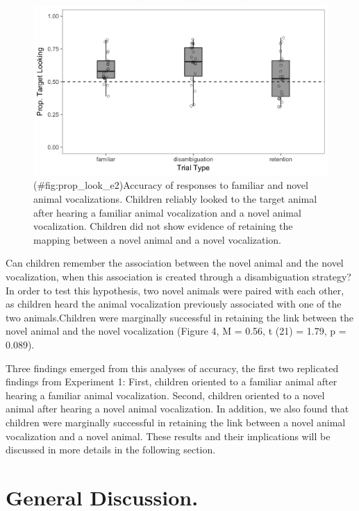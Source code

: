\documentclass[english,floatsintext,man]{apa6}
\theoremstyle{definition}
\theoremstyle{definition}
\theoremstyle{definition}
\theoremstyle{remark}
\begin{document}
\begin{figure}
\centering
\includegraphics{anime_manuscript_files/figure-latex/prop_look_e2-1.pdf}
\caption{(\#fig:prop\_look\_e2)Accuracy of responses to familiar and
novel animal vocalizations. Children reliably looked to the target
animal after hearing a familiar animal vocalization and a novel animal
vocalization. Children did not show evidence of retaining the mapping
between a novel animal and a novel vocalization.}
\end{figure}

Can children remember the association between the novel animal and the
novel vocalization, when this association is created through a
disambiguation strategy? In order to test this hypothesis, two novel
animals were paired with each other, as children heard the animal
vocalization previously associated with one of the two animals.Children
were marginally successful in retaining the link between the novel
animal and the novel vocalization (Figure 4, M = 0.56, t (21) = 1.79, p
= 0.089).

Three findings emerged from this analyses of accuracy, the first two
replicated findings from Experiment 1: First, children oriented to a
familiar animal after hearing a familiar animal vocalization. Second,
children oriented to a novel animal after hearing a novel animal
vocalization. In addition, we also found that children were marginally
successful in retaining the link between a novel animal vocalization and
a novel animal. These results and their implications will be discussed
in more details in the following section.

\section{General Discussion.}\label{general-discussion.}
\end{document}
